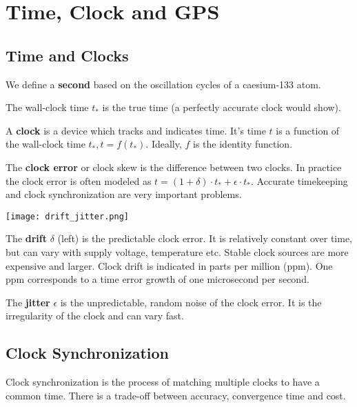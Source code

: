 \section{Time, Clock and GPS}


\subsection{Time and Clocks}

We define a \textbf{second} based on the oscillation cycles of a caesium-133 atom.\medskip

The wall-clock time $t_*$ is the true time (a perfectly accurate clock would show). \medskip

A \textbf{clock} is a device which tracks and indicates time. It’s time $t$ is a function of the wall-clock time $t_*, t = f(t_*)$. Ideally, $f$ is the identity function. \medskip

The \textbf{clock error} or clock skew is the difference between two clocks. In practice the clock error is often modeled as $t = (1 + \delta) \cdot t_* + \epsilon \cdot t_*$. Accurate timekeeping and clock synchronization are very important problems.
\begin{center}
	\texttt{[image: drift\_jitter.png]}
\end{center}

The \textbf{drift} $\delta$ (left) is the predictable clock error. It is relatively constant over time, but can vary with supply voltage, temperature etc. Stable clock sources are more expensive and larger. Clock drift is indicated in parts per million (ppm). One ppm corresponds to a time error growth of one microsecond per second. \medskip

The \textbf{jitter} $\epsilon$ is the unpredictable, random noise of the clock error. It is the irregularity of the clock and can vary fast.


\subsection{Clock Synchronization}

Clock synchronization is the process of matching multiple clocks to have a common time. There is a trade-off between accuracy, convergence time and cost.\medskip

